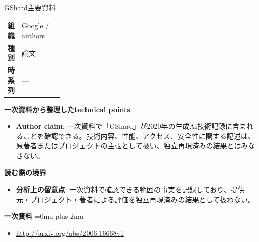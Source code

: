 \begin{technicalnote}{GShard}{主要資料}
\begingroup
\begin{tabularx}{\linewidth}{@{}>{\bfseries}p{0.22\linewidth}X@{}}
組織 & Google / authors \\
種別 & 論文 \\
時系列 & — \\
\end{tabularx}
\smallskip
{\bfseries 一次資料から整理したtechnical points}
\begin{itemize}[leftmargin=1.5em,itemsep=0.35em]
\item \textbf{Author claim}: 一次資料で「GShard」が2020年の生成AI技術記録に含まれることを確認できる。技術内容、性能、アクセス、安全性に関する記述は、原著者またはプロジェクトの主張として扱い、独立再現済みの結果とはみなさない。
\end{itemize}
\begin{minipage}{\linewidth}
{\bfseries 読む際の境界}
\begin{itemize}[leftmargin=1.5em,itemsep=0.35em]
\item \textbf{分析上の留意点}: 一次資料で確認できる範囲の事実を記録しており、提供元・プロジェクト・著者による評価を独立再現済みの結果として扱わない。
\end{itemize}
\begin{samepage}
{\bfseries 一次資料}
\begingroup\sloppy
\Urlmuskip=0mu plus 2mu\relax
\begin{itemize}[leftmargin=1.5em,itemsep=0.25em]
\item {\scriptsize\url{http://arxiv.org/abs/2006.16668v1}}
\end{itemize}
\endgroup
\end{samepage}
\end{minipage}
\endgroup
\end{technicalnote}
\medskip
